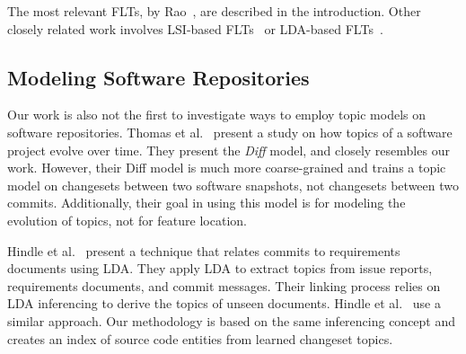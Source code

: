 The most relevant FLTs, by Rao~\cite{Rao-etal:2013, Rao:2013}, are described in the introduction.
Other closely related work involves LSI-based FLTs~\cite{Marcus-etal:2004,Poshyvanyk-etal:2006,Poshyvanyk-Marcus:2007,Liu-etal:2007,Scanniello-Marcus:2011,Cubranic-etal:2005} or LDA-based FLTs~\cite{Lukins-etal:2008,Lukins-etal:2010,Biggers-etal:2014,Bassett-Kraft:2013}.





\subsection{Modeling Software Repositories}

Our work is also not the first to investigate ways to employ topic models on
software repositories. Thomas et al.~\cite{Thomas-etal:2011} present a study on
how topics of a software project evolve over time. They present the \emph{Diff}
model, and closely resembles our work. However, their Diff model is much more
coarse-grained and trains a topic model on changesets between two software
snapshots, not changesets between two commits. Additionally, their goal in using
this model is for modeling the evolution of topics, not for feature location.

Hindle et al.~\cite{Hindle-etal:2009} present a technique that relates
commits to requirements documents using LDA.  They apply LDA to extract
topics from issue reports, requirements documents, and commit messages.  Their
linking process relies on LDA inferencing to derive the topics of unseen documents.
Hindle et al.~\cite{Hindle-etal:2014} use a similar approach.
Our methodology is based on the same inferencing concept and
creates an index of source code entities from learned changeset topics.
